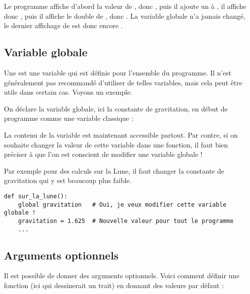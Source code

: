 \documentclass[11pt,class=report,crop=false]{standalone}
\begin{document}

Le programme affiche d'abord la valeur de , donc , puis il ajoute un à , il affiche donc , puis il affiche le double de , donc . La variable globale  n'a jamais changé, le dernier affichage de  est donc encore .

\subsection{Variable globale}

Une  est une variable qui est définie pour l'ensemble du programme. Il n'est généralement pas recommandé d'utiliser de telles variables, mais cela peut être utile dans certain cas. Voyons un exemple.

On déclare la variable globale, ici la constante de gravitation, en début de programme comme une variable classique : \\
\centerline{}

La contenu de la variable  est maintenant accessible partout.
Par contre, si on souhaite changer la valeur de cette variable dans une fonction, il faut bien préciser à \Python{} que l'on est conscient de modifier une variable globale !

Par exemple pour des calculs sur la Lune, il faut changer la constante de gravitation qui y est beaucoup plus faible.

\begin{lstlisting}
def sur_la_lune():
    global gravitation   # Oui, je veux modifier cette variable globale !
    gravitation = 1.625  # Nouvelle valeur pour tout le programme    
    ...
\end{lstlisting}


\subsection{Arguments optionnels}


Il est possible de donner des arguments optionnels. Voici comment définir une fonction (ici qui dessinerait un trait) en donnant des valeurs par défaut :\\
 \centerline{}
 
\end{document}
